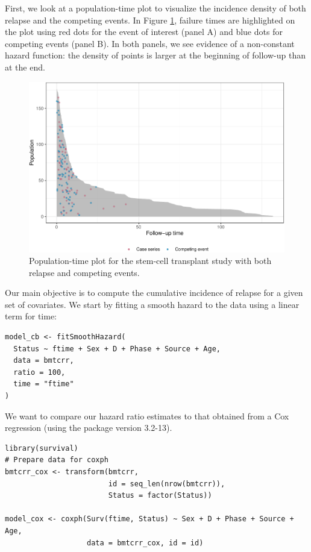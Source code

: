 First, we look at a population-time plot to visualize the incidence density of both relapse and the competing events. In Figure \ref{fig:compPop}, failure times are highlighted on the plot using red dots for the event of interest (panel A) and blue dots for competing events (panel B). In both panels, we see evidence of a non-constant hazard function: the density of points is larger at the beginning of follow-up than at the end.

\begin{figure}[ht]
\includegraphics[width=\textwidth,keepaspectratio=true]{./compPop-1} \caption{Population-time plot for the stem-cell transplant study with both relapse and competing events.}\label{fig:compPop}
\end{figure}

Our main objective is to compute the cumulative incidence of relapse for a given set of covariates. We start by fitting a smooth hazard to the data using a linear term for time:

\begin{verbatim}
model_cb <- fitSmoothHazard(
  Status ~ ftime + Sex + D + Phase + Source + Age,
  data = bmtcrr,
  ratio = 100,
  time = "ftime"
)
\end{verbatim}

We want to compare our hazard ratio estimates to that obtained from a Cox regression (using the  package version 3.2-13).

\begin{verbatim}
library(survival)
# Prepare data for coxph
bmtcrr_cox <- transform(bmtcrr, 
                        id = seq_len(nrow(bmtcrr)),
                        Status = factor(Status))

model_cox <- coxph(Surv(ftime, Status) ~ Sex + D + Phase + Source + Age,
                   data = bmtcrr_cox, id = id)
\end{verbatim}

